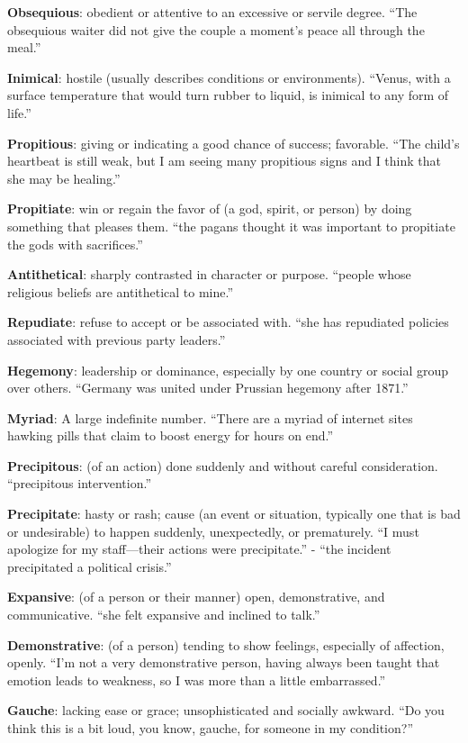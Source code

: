 \documentclass[12pt, a4paper]{ximera}
\begin{document}
\textbf{Obsequious}: obedient or attentive to an excessive or servile degree. ``The obsequious waiter did not give the couple a moment's peace all through the meal.''

\textbf{Inimical}: hostile (usually describes conditions or environments). ``Venus, with a surface temperature that would turn rubber to liquid, is inimical to any form of life.''

\textbf{Propitious}: giving or indicating a good chance of success; favorable. ``The child's heartbeat is still weak, but I am seeing many propitious signs and I think that she may be healing.''

\textbf{Propitiate}: win or regain the favor of (a god, spirit, or person) by doing something that pleases them. ``the pagans thought it was important to propitiate the gods with sacrifices.''

\textbf{Antithetical}: sharply contrasted in character or purpose. ``people whose religious beliefs are antithetical to mine.''

\textbf{Repudiate}: refuse to accept or be associated with. ``she has repudiated policies associated with previous party leaders.''

\textbf{Hegemony}: leadership or dominance, especially by one country or social group over others. ``Germany was united under Prussian hegemony after 1871.''

\textbf{Myriad}: A large indefinite number. ``There are a myriad of internet sites hawking pills that claim to boost energy for hours on end.''

\textbf{Precipitous}: (of an action) done suddenly and without careful consideration. ``precipitous intervention.''

\textbf{Precipitate}: hasty or rash; cause (an event or situation, typically one that is bad or undesirable) to happen suddenly, unexpectedly, or prematurely. ``I must apologize for my staff—their actions were precipitate.'' - ``the incident precipitated a political crisis.''

\textbf{Expansive}: (of a person or their manner) open, demonstrative, and communicative. ``she felt expansive and inclined to talk.''

\textbf{Demonstrative}: (of a person) tending to show feelings, especially of affection, openly. ``I'm not a very demonstrative person, having always been taught that emotion leads to weakness, so I was more than a little embarrassed.''

\textbf{Gauche}: lacking ease or grace; unsophisticated and socially awkward. ``Do you think this is a bit loud, you know, gauche, for someone in my condition?''
\end{document}
